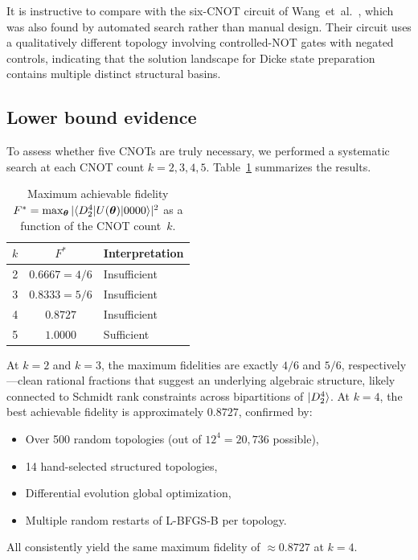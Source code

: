 \documentclass[twocolumn,10pt]{article}
\begin{document}
It is instructive to compare with the six-CNOT circuit of Wang~et~al.~\cite{wang2024},
which was also found by automated search rather than manual design. Their
circuit uses a qualitatively different topology involving controlled-NOT gates
with negated controls, indicating that the solution landscape for Dicke state
preparation contains multiple distinct structural basins.

\subsection{Lower bound evidence}
\label{sec:lower}

To assess whether five CNOTs are truly necessary, we performed a systematic
search at each CNOT count $k = 2, 3, 4, 5$. Table~\ref{tab:lower} summarizes
the results.

\begin{table}[t]
\centering
\caption{Maximum achievable fidelity $F^* = \max_{\boldsymbol{\theta}} |\!\braket{D_2^4|U(\boldsymbol{\theta})|0000}\!|^2$ as a function of the CNOT count~$k$.}
\label{tab:lower}
\begin{tabular}{ccl}
\toprule
$k$ & $F^*$ & Interpretation \\
\midrule
2 & $0.6667 = 4/6$ & Insufficient \\
3 & $0.8333 = 5/6$ & Insufficient \\
4 & $0.8727$ & Insufficient \\
5 & $1.0000$ & Sufficient \\
\bottomrule
\end{tabular}
\end{table}

At $k = 2$ and $k = 3$, the maximum fidelities are exactly $4/6$ and $5/6$,
respectively---clean rational fractions that suggest an underlying algebraic
structure, likely connected to Schmidt rank constraints across bipartitions of
$\ket{D_2^4}$. At $k = 4$, the best achievable fidelity is approximately
$0.8727$, confirmed by:
\begin{itemize}
    \item Over 500 random topologies (out of $12^4 = 20{,}736$ possible),
    \item 14 hand-selected structured topologies,
    \item Differential evolution global optimization,
    \item Multiple random restarts of L-BFGS-B per topology.
\end{itemize}
All consistently yield the same maximum fidelity of $\approx 0.8727$ at $k=4$.
\end{document}
